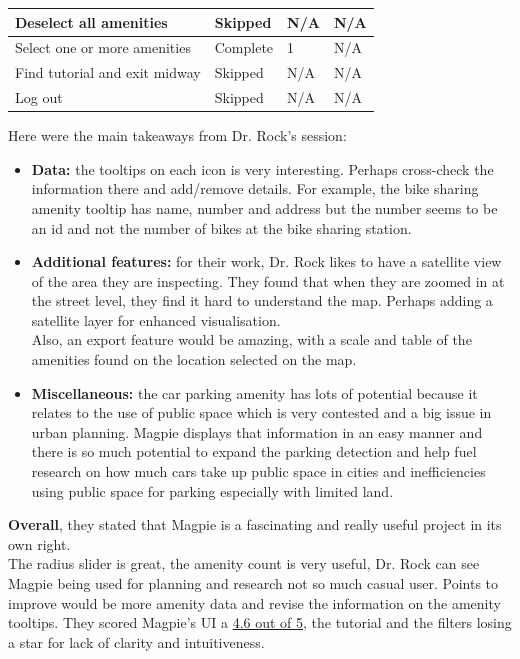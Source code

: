 \begin{table}[h!]
\begin{tabular}{|p{}|p{}|p{}|p{}|}
        \hline
        Deselect all amenities        & Skipped         & N/A                 & N/A                             \\
        \hline
        Select one or more amenities  & Complete        & 1                   & N/A                             \\
        \hline
        Find tutorial and exit midway & Skipped         & N/A                 & N/A                             \\
        \hline
        Log out                       & Skipped         & N/A                 & N/A                             \\
        \hline
    \end{tabular}
\end{table}

\newpage Here were the main takeaways from Dr. Rock's session:
\begin{itemize}
    \item \textbf{Data:} the tooltips on each icon is very interesting. Perhaps cross-check the information there and add/remove details. For example, the bike sharing amenity tooltip has name, number and address but the number seems to be an id and not the number of bikes at the bike sharing station.\\
    \item \textbf{Additional features:} for their work, Dr. Rock likes to have a satellite view of the area they are inspecting. They found that when they are zoomed in at the street level, they find it hard to understand the map. Perhaps adding a satellite layer for enhanced visualisation.\\ Also, an export feature would be amazing, with a scale and table of the amenities found on the location selected on the map.\\
    \item \textbf{Miscellaneous:} the car parking amenity has lots of potential because it relates to the use of public space which is very contested and a big issue in urban planning. Magpie displays that information in an easy manner and there is so much potential to expand the parking detection and help fuel research on how much cars take up public space in cities and inefficiencies using public space for parking especially with limited land.
\end{itemize}
\textbf{Overall}, they stated that Magpie is a fascinating and really useful project in its own right.\\
The radius slider is great, the amenity count is very useful, Dr. Rock can see Magpie being used for planning and research not so much casual user. Points to improve would be more amenity data and revise the information on the amenity tooltips. They scored Magpie's UI a \underline{4.6 out of 5}, the tutorial and the filters losing a star for lack of clarity and intuitiveness.
